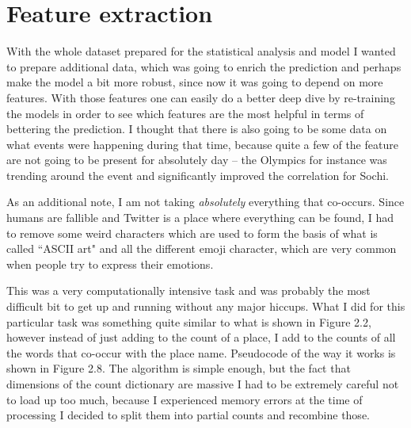 \documentclass[minf,twoside,singlespacing,parskip,frontabs]{infthesis}
\begin{document}
\section{Feature extraction}
\label{feat-extraction}

With the whole dataset prepared for the statistical analysis and model I wanted to prepare additional data, which was going to enrich the prediction and perhaps make the model a bit more robust, since now it was going to depend on more features. With those features one can easily do a better deep dive by re-training the models in order to see which features are the most  helpful in terms of bettering the prediction. I thought that there is also going to be some data on what events were happening during that time, because quite a few of the feature are not going to be present for absolutely day -- the Olympics for instance was trending around the event and significantly improved the correlation for Sochi. 


As an additional note, I am not taking \textit{absolutely} everything that co-occurs. Since humans are fallible and Twitter is a place where everything can be found, I had to remove some weird characters which are used to form the basis of what is called ``ASCII art" and all the different emoji character, which are very common when people try to express their emotions.  


This was a very computationally intensive task and was probably the most difficult bit to get up and running without any major hiccups. What I did for this particular task was something quite similar to what is shown in Figure 2.2, however instead of just adding to the count of a place, I add to the counts of all the words that co-occur with the place name.  Pseudocode of the way it works is shown in Figure 2.8. The algorithm is simple enough, but the fact that dimensions of the count dictionary are massive I had to be extremely careful not to load up too much, because I experienced memory errors at the time of processing I decided to split them into partial counts and recombine those. 
\end{document}
